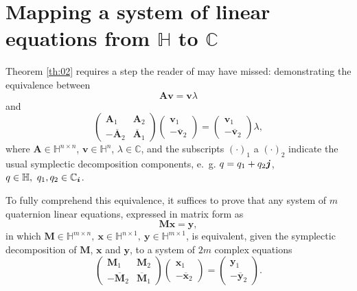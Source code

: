 \chapter{Mapping a system of linear equations from $ \mathbb{H} $ to $ \mathbb{C} $}
\label{ch:AppendixA}

Theorem \ref{th:02} requires a step the reader of \cite{zhang1997quaternions} may have missed: demonstrating the equivalence between
\begin{equation}
    \label{eq:A1}
    \mathbf{A} \mathbf{v} = \mathbf{v} \lambda
\end{equation}
and
\begin{equation}
    \begin{pmatrix}
        \mathbf{A}_1              & \mathbf{A}_2            \\
        - \overline{\mathbf{A}}_2 & \overline{\mathbf{A}}_1
    \end{pmatrix}
    \begin{pmatrix}
        \mathbf{v}_1 \\
        - \overline{\mathbf{v}}_2
    \end{pmatrix} =
    \begin{pmatrix}
        \mathbf{v}_1 \\
        - \overline{\mathbf{v}}_2
    \end{pmatrix}
    \lambda,
\end{equation}
where $ \mathbf{A} \in \mathbb{H}^{n \times n} $, $ \mathbf{v} \in \mathbb{H}^{n} $, $ \lambda \in \mathbb{C} $, and the subscripts $ (\cdot)_1 $ a $ (\cdot)_2 $ indicate the usual symplectic decomposition components, e.~g. $ q = q_1 + q_2 \boldsymbol{j} $, $q\in \mathbb{H}, \ q_1, q_2 \in \mathbb{C}_{\boldsymbol{i}} $.

To fully comprehend this equivalence, it suffices to prove that any system of $ m $ quaternion linear equations, expressed in matrix form as
\begin{equation}
    \label{eq:A2}
    \mathbf{M} \mathbf{x} = \mathbf{y},
\end{equation}
in which $ \mathbf{M} \in \mathbb{H}^{m\times n} ,\ \mathbf{x} \in \mathbb{H}^{n \times 1}, \ \mathbf{y} \in \mathbb{H}^{m \times 1} $, is equivalent, given the symplectic decomposition of $ \mathbf{M} $, $ \mathbf{x} $ and $ \mathbf{y} $, to a system of $ 2m $ complex equations
\begin{equation}
    \label{eq:A3}
    \begin{pmatrix}
        \mathbf{M}_1              & \mathbf{M}_2            \\
        - \overline{\mathbf{M}}_2 & \overline{\mathbf{M}}_1
    \end{pmatrix}
    \begin{pmatrix}
        \mathbf{x}_1 \\
        - \overline{\mathbf{x}}_2
    \end{pmatrix}
    =
    \begin{pmatrix}
        \mathbf{y}_1 \\
        - \overline{\mathbf{y}}_2
    \end{pmatrix}.
\end{equation}

